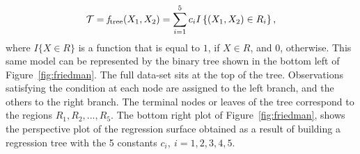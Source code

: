 {\begin{equation}
\mathcal{T} = \mathit{f}_{\mathrm{tree}}(X_1,X_2) = \sum_{i=1}^{5} c_i I\left\lbrace(X_1,X_2) \in R_i\right\rbrace,
\label{eq:response}
\end{equation}
where $I\{X\in R\}$ is a function that is equal to $1$, if $X\in R$, and $0$, otherwise.
This same model can be represented by the binary tree shown in the bottom left of Figure~\ref{fig:friedman}. 
The full data-set sits at the top of the tree. 
Observations satisfying the condition at each node are assigned to the left branch, and the others to the right branch. The terminal nodes or leaves of the tree correspond to the regions $R_1,R_2,...,R_5$. 
The bottom right plot of Figure~\ref{fig:friedman}, shows the perspective plot of the regression surface obtained as a result of building a regression tree with the 5 constants $c_i,\ i=1,2,3,4,5$. }

